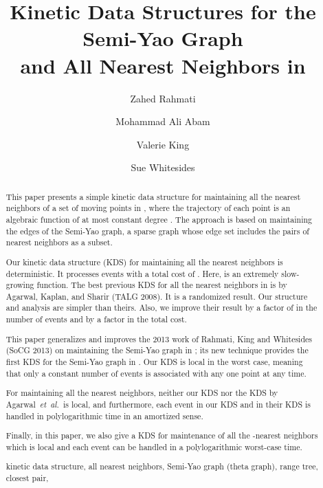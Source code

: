 \documentclass[11pt]{llncs}
\title{Kinetic Data Structures for the Semi-Yao Graph\\ and All Nearest Neighbors in }
\author{\small
Zahed Rahmati
\and
Mohammad Ali Abam
\and
Valerie King
\and
Sue Whitesides
}
\institute{\small
Dept. of Computer Science, University of Victoria, Canada. \\{\tt \{rahmati,val,sue\}@uvic.ca}\\
Dept. of Computer Engineering, Sharif University of Technology, Iran. \\{\tt abam@sharif.edu}
}
\newcommand{\etal}{\emph{et~al.}}
\newcommand{\keywords}[1]{\par\addvspace\baselineskip
\noindent\keywordname\enspace\ignorespaces#1}
\begin{document}
\maketitle
\begin{abstract}
This paper presents a simple kinetic data structure for maintaining all the nearest neighbors of a set of  moving points in , where the trajectory of each point is an algebraic function of at most constant degree .  The approach is based on maintaining the edges of the Semi-Yao graph, a sparse graph whose edge set includes the pairs of nearest neighbors as a subset. 

\vspace{+5pt}
Our kinetic data structure (KDS) for maintaining all the nearest neighbors is deterministic. It processes  events with a total cost of . Here,  is an extremely slow-growing function. The best previous KDS for all the nearest neighbors in  is by Agarwal, Kaplan, and Sharir (TALG 2008). It is a randomized result. Our structure and analysis are simpler than theirs. Also, we improve their result by a factor of  in the number of events and by a  factor in the total cost.

\vspace{+5pt}
This paper generalizes and improves the 2013 work of Rahmati, King and Whitesides (SoCG 2013) on maintaining the Semi-Yao graph in ;  its new technique provides the first KDS for the Semi-Yao graph in . Our KDS is local in the worst case, meaning that only a constant number of events is associated with any one point at any time.

\vspace{+5pt}
For maintaining all the nearest neighbors, neither our KDS nor the KDS by Agarwal~\etal~is local, and furthermore, each event in our KDS and in their KDS is handled in polylogarithmic time in an amortized sense. 

\vspace{+5pt}
Finally, in this paper, we also give a KDS for maintenance of all the -nearest neighbors which is local and each event can be handled in a polylogarithmic worst-case time.
\keywords{kinetic data structure, all nearest neighbors, Semi-Yao graph (theta graph), range tree, closest pair, }
\end{abstract}
\newpage
\setcounter{page}{1}
\end{document}
